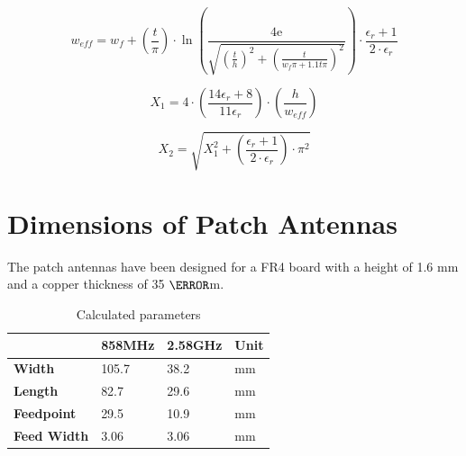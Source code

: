 \begin{equation}\label{eq:weff}
w_{eff} = w_{f}+\left(\frac{t}{\pi} \right) \cdot \ln \left(\frac{4\text{e}}{\sqrt{\left(\frac{t}{h}\right)^2+\left(\frac{t}{w_{f}\pi+1.1t\pi}\right)^2}}\right)\cdot \frac{\epsilon_r+1}{2\cdot \epsilon_r}
\end{equation}
\begin{where}
\end{where}

\begin{equation}\label{eq:x1}
X_1 = 4\cdot \left(\frac{14 \epsilon_r +8}{11 \epsilon_r}\right)\cdot \left(\frac{h}{w_{eff}}\right)
\end{equation}

\begin{equation}\label{eq:x2}
X_2 = \sqrt{X_1^2+\left(\frac{\epsilon_r+1}{2\cdot \epsilon_r}\right)\cdot\pi^2}
\end{equation}


\section{Dimensions of Patch Antennas}

The patch antennas have been designed for a FR4 board with a height of 1.6 mm and a copper thickness of 35 $\micro$m.

\begin{table}[H]
\centering
\begin{tabular}{l|lll}
                & \textbf{858MHz} & \textbf{2.58GHz} & \textbf{Unit} \\\hline
\textbf{Width}  & 105.7           & 38.2            & mm            \\
\textbf{Length} & 82.7            & 29.6            & mm            \\
\textbf{Feedpoint}  & 29.5            & 10.9            & mm            \\
\textbf{Feed Width}  & 3.06            & 3.06            & mm           
\end{tabular}
\caption{Calculated parameters}
\label{tab:parameters}
\end{table}


